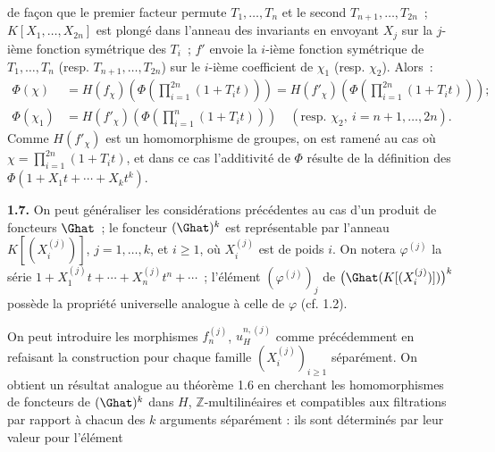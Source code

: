 de façon que le
premier facteur permute \(T_1,\ldots,T_n\) et le second \(T_{n+1},\ldots,T_{2n}\)~; \(K[X_1,\ldots,X_{2n}]\) est plongé dans l'anneau des invariants en envoyant \(X_j\) sur la \(j\)-ième fonction symétrique des \(T_i\)~; \(f'\) envoie la \(i\)-ième fonction symétrique de \(T_1,\ldots,T_n\) (resp. \(T_{n+1},\ldots,T_{2n}\)) sur le \(i\)-ième coefficient de \(\chi_1\) (resp. \(\chi_2\)). Alors~:
\[
\begin{aligned}
\Phi(\chi)
&=H(f_\chi)\left(\Phi\left(\prod_{i=1}^{2n}(1+T_it)\right)\right)
=H(f'_\chi)\left(\Phi\left(\prod_{i=1}^{2n}(1+T_it)\right)\right);\\
\Phi(\chi_1) &=H(f'_\chi)\left(\Phi\left(\prod_{i=1}^{n}(1+T_it)\right)\right)\quad(\text{resp. }\chi_2,\ i=n+1,\ldots,2n).
\end{aligned}
\]
Comme \(H(f'_\chi)\) est un homomorphisme de groupes, on est ramené au cas où \(\chi=\prod_{i=1}^{2n}(1+T_it)\), et dans ce cas l'additivité de \(\Phi\) résulte de la définition des \(\Phi(1+X_1t+\cdots+X_k t^k)\).

\textbf{1.7.} On peut généraliser les considérations précédentes au cas d'un produit de foncteurs \(\Ghat\)~; le foncteur \((\Ghat)^k\) est représentable par l'anneau
\(K[(X_i^{(j)})]\), \(j=1,\ldots,k\), et \(i\geq 1\), où \(X_i^{(j)}\) est de poids \(i\). On notera \(\varphi^{(j)}\) la série \(1+X_1^{(j)}t+\cdots+X_n^{(j)}t^n+\cdots\)~; l'élément \((\varphi^{(j)})_j\) de \(\bigl(\Ghat(K[(X_i^{(j)})])\bigr)^k\) possède la propriété universelle analogue à celle de \(\varphi\) (cf. 1.2).

On peut introduire les morphismes \(f_n^{(j)}\), \(u_H^{n,(j)}\) comme précédemment en refaisant la construction pour chaque famille \((X_i^{(j)})_{i\geq 1}\) séparément. On obtient un résultat analogue au théorème 1.6 en cherchant les homomorphismes de foncteurs de \((\Ghat)^k\) dans \(H\), \(\mathbb Z\)-multilinéaires et compatibles aux filtrations par rapport à chacun des \(k\) arguments séparément : ils sont déterminés par leur valeur pour l'élément
